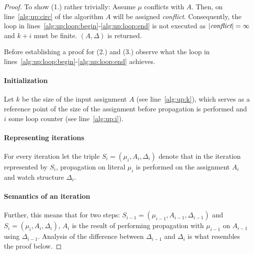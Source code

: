 \documentclass{vutinfth} %
\theoremstyle{example}
\theoremstyle{definition}
\theoremstyle{theorem}
\theoremstyle{lemma}
\theoremstyle{corollary}
\newcommand{\ass}{A}
\newcommand{\sgl}{\mu}
\begin{document}
\begin{proof}


To show (1.) rather trivially: Assume $\sgl$ conflicts with $\ass$. Then, on line~\ref{alg:up:circ} of the algorithm $\ass$ will be assigned \emph{conflict}. Consequently, the loop in lines~\ref{alg:up:loop:begin}-\ref{alg:up:loop:end} is not executed as $|\emph{conflict}| = \infty$ and $k + i$ must be finite. $(\ass, \Delta)$ is returned.


Before establishing a proof for (2.) and (3.) observe what the loop in lines~\ref{alg:up:loop:begin}-\ref{alg:up:loop:end} achieves.

\paragraph{Initialization} Let $k$ be the size of the input assignment $\ass$ (see line~\ref{alg:up:k}), which serves as a reference point of the size of the assignment before propagation is performed and $i$ some loop counter (see line~\ref{alg:up:i}).

\paragraph{Representing iterations} For every iteration let the triple $S_i = (\sgl_i, \ass_i,  \Delta_i)$ denote that in the iteration represented by $S_i$, propagation on literal $\sgl_i$ is performed on the assignment $A_i$ and watch structure $\Delta_i$.

\paragraph{Semantics of an iteration} Further, this means that for two steps: $S_{i-1} = (\sgl_{i-1}, \ass_{i-1}, \Delta_{i-1})$ and $S_i = (\sgl_i, \ass_i, \Delta_i)$, $\ass_i$ is the result of performing propagation with $\sgl_{i-1}$ on $\ass_{i-1}$ using $\Delta_{i-1}$. Analysis of the difference between $\Delta_{i-1}$ and $\Delta_i$ is what resembles the proof below.


\end{proof}
\end{document}
